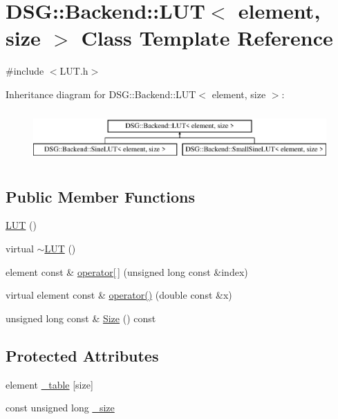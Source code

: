 \hypertarget{classDSG_1_1Backend_1_1LUT}{\section{D\+S\+G\+:\+:Backend\+:\+:L\+U\+T$<$ element, size $>$ Class Template Reference}
\label{classDSG_1_1Backend_1_1LUT}
}


{\ttfamily \#include $<$L\+U\+T.\+h$>$}

Inheritance diagram for D\+S\+G\+:\+:Backend\+:\+:L\+U\+T$<$ element, size $>$\+:\begin{figure}[H]
\begin{center}
\leavevmode
\includegraphics[height=1.985816cm]{classDSG_1_1Backend_1_1LUT}
\end{center}
\end{figure}
\subsection*{Public Member Functions}
\begin{DoxyCompactItemize}
\item 
\hyperlink{classDSG_1_1Backend_1_1LUT_af1a9dbe842f12dbd64dd90553bb8da5a}{L\+U\+T} ()
\item 
virtual \hyperlink{classDSG_1_1Backend_1_1LUT_ad38fd365aacce7f082c68a9f9d84eeac}{$\sim$\+L\+U\+T} ()
\item 
element const \& \hyperlink{classDSG_1_1Backend_1_1LUT_a50d8304c33760ed566039ebf5657807c}{operator\mbox{[}$\,$\mbox{]}} (unsigned long const \&index)
\item 
virtual element const \& \hyperlink{classDSG_1_1Backend_1_1LUT_aa31a17b115eebb9a2a9ad45b32c8d26a}{operator()} (double const \&x)
\item 
unsigned long const \& \hyperlink{classDSG_1_1Backend_1_1LUT_a988c07b5002e0aee6e490244b80c8830}{Size} () const 
\end{DoxyCompactItemize}
\subsection*{Protected Attributes}
\begin{DoxyCompactItemize}
\item 
element \hyperlink{classDSG_1_1Backend_1_1LUT_a23615428e84d6be4424c8b897866f253}{\+\_\+table} \mbox{[}size\mbox{]}
\item 
const unsigned long \hyperlink{classDSG_1_1Backend_1_1LUT_ae18fa23936c51c1bdbd21311c9f1054e}{\+\_\+size}
\end{DoxyCompactItemize}


